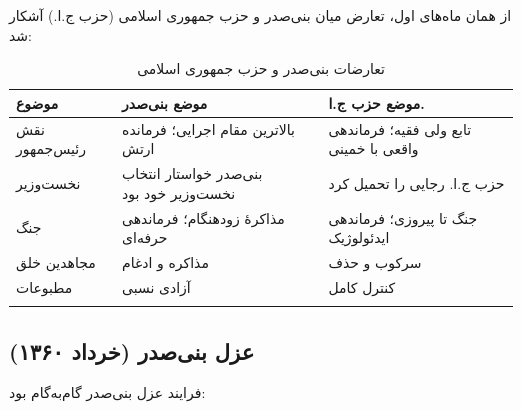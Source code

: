 \documentclass[12pt,a4paper]{book}
\begin{document}
از همان ماه‌های اول، تعارض میان بنی‌صدر و حزب جمهوری اسلامی (حزب ج.ا.) آشکار شد:

\begin{longtable}{%
    >{\raggedleft\arraybackslash}p{}
    >{\raggedleft\arraybackslash}p{}
    >{\raggedleft\arraybackslash}p{}}
\toprule
\rowcolor{cPrimary!10}
\textbf{موضوع} & \textbf{موضع بنی‌صدر} & \textbf{موضع حزب ج.ا.} \\
\midrule
\endhead

نقش رئیس‌جمهور &
بالاترین مقام اجرایی؛ فرمانده ارتش &
تابع ولی فقیه؛ فرماندهی واقعی با خمینی \\
\midrule

نخست‌وزیر &
بنی‌صدر خواستار انتخاب نخست‌وزیر خود بود &
حزب ج.ا. رجایی را تحمیل کرد \\
\midrule

جنگ &
مذاکرهٔ زودهنگام؛ فرماندهی حرفه‌ای &
جنگ تا پیروزی؛ فرماندهی ایدئولوژیک \\
\midrule

مجاهدین خلق &
مذاکره و ادغام &
سرکوب و حذف \\
\midrule

مطبوعات &
آزادی نسبی &
کنترل کامل \\

\bottomrule
\caption{تعارضات بنی‌صدر و حزب جمهوری اسلامی}
\label{tab:banisadr-vs-irp}
\end{longtable}

\subsection{عزل بنی‌صدر (خرداد ۱۳۶۰)}

فرایند عزل بنی‌صدر گام‌به‌گام بود:
\end{document}
